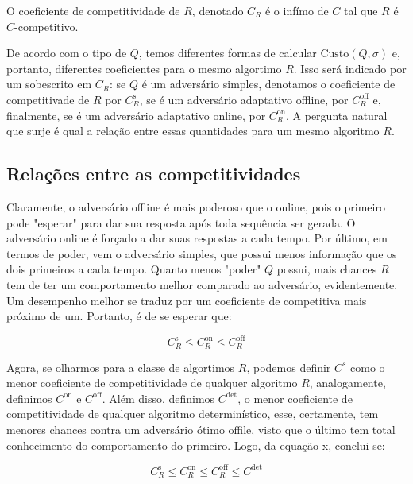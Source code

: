 O coeficiente de competitividade de \(R\), denotado \(C_R\) é o infímo de \(C\) tal que \(R\) é \(C\)-competitivo.

De acordo com o tipo de \(Q\), temos diferentes formas de calcular \(\text{Custo}(Q, \sigma)\) e, portanto, diferentes coeficientes para o mesmo algortimo \(R\). Isso será indicado por um sobescrito em \(C_R\): se \(Q\) é um adversário simples, denotamos o coeficiente de competitivade de \(R\) por \(C_R^{\text{s}}\), se é um adversário adaptativo offline, por \(C_R^{\text{off}}\) e, finalmente, se é um adversário adaptativo online, por \(C_R^{\text{on}}\). A pergunta natural que surje é qual a relação entre essas quantidades para um mesmo algoritmo \(R\).

\subsection{Relações entre as competitividades}

Claramente, o adversário offline é mais poderoso que o online, pois o primeiro pode "esperar" para dar sua resposta após toda sequência ser gerada. O adversário online é forçado a dar suas respostas a cada tempo. Por último, em termos de poder, vem o adversário simples, que possui menos informação que os dois primeiros a cada tempo. Quanto menos "poder" \(Q\) possui, mais chances \(R\) tem de ter um comportamento melhor comparado ao adversário, evidentemente. Um desempenho melhor se traduz por um coeficiente de competitiva mais próximo de um. Portanto, é de se esperar que:

\begin{equation}
  C_R^{\text{s}} \leqslant C_R^{\text{on}} \leqslant C_R^{\text{off}}
\end{equation}

Agora, se olharmos para a classe de algortimos \(R\), podemos definir \(C^{s}\) como o menor coeficiente de competitividade de qualquer algoritmo \(R\), analogamente, definimos \(C^\text{{on}}\) e \(C^\text{{off}}\). Além disso, definimos \(C^{\text{det}}\), o menor coeficiente de competitividade de qualquer algoritmo determinístico, esse, certamente, tem menores chances contra um adversário ótimo offile, visto que o último tem total conhecimento do comportamento do primeiro. Logo, da equação x, conclui-se:

\begin{equation}
  C_R^{\text{s}} \leqslant C_R^{\text{on}} \leqslant C_R^{\text{off}} \leqslant C^{\text{det}}
\end{equation}

